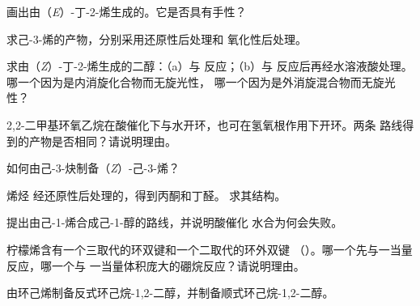 \begin{exercise}[$\star$]\label{exo:b2:alkene-redox:3}
画出由（\textit{E}）-丁-2-烯生成的。它是否具有手性？
\end{exercise}

\begin{exercise}[$\star$]\label{exo:b2:alkene-redox:4}
求己-3-烯的产物，分别采用还原性后处理和
氧化性后处理。
\end{exercise}

\begin{exercise}[$\star\star$]\label{exo:b2:alkene-redox:5}
求由（\textit{Z}）-丁-2-烯生成的二醇：（a）与  反应；（b）与
反应后再经水溶液酸处理。哪一个因为是内消旋化合物而无旋光性，
哪一个因为是外消旋混合物而无旋光性？
\end{exercise}

\begin{exercise}[$\star\star$]\label{exo:b2:alkene-redox:6}
2,2-二甲基环氧乙烷在酸催化下与水开环，也可在氢氧根作用下开环。两条
路线得到的产物是否相同？请说明理由。
\end{exercise}

\begin{exercise}[$\star\star$]\label{exo:b2:alkene-redox:7}
如何由己-3-炔制备（\textit{Z}）-己-3-烯？
\end{exercise}

\begin{exercise}[$\star\star$]\label{exo:b2:alkene-redox:8}
烯烃  经还原性后处理的，得到丙酮和丁醛。
求其结构。
\end{exercise}

\begin{exercise}[$\star\star$]\label{exo:b2:alkene-redox:9}
提出由己-1-烯合成己-1-醇的路线，并说明酸催化
水合为何会失败。
\end{exercise}

\begin{exercise}[$\star\star\star$]\label{exo:b2:alkene-redox:10}
柠檬烯含有一个三取代的环双键和一个二取代的环外双键
（）。哪一个先与一当量反应，哪一个与
一当量体积庞大的硼烷反应？请说明理由。
\end{exercise}

\begin{exercise}[$\star\star\star$]\label{exo:b2:alkene-redox:11}
由环己烯制备反式环己烷-1,2-二醇，并制备顺式环己烷-1,2-二醇。
\end{exercise}

